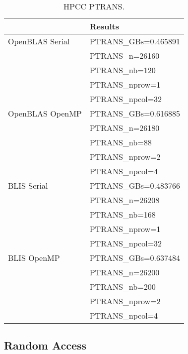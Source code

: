 \begin{table}[H]
\begin{center}
\begin{tabular}{ |l|l| } 
\hline
                & Results \\
\hline
OpenBLAS Serial & PTRANS\_GBs=0.465891 \\
                & PTRANS\_n=26160 \\ 
                & PTRANS\_nb=120 \\
                & PTRANS\_nprow=1 \\
                & PTRANS\_npcol=32 \\
\hline
OpenBLAS OpenMP & PTRANS\_GBs=0.616885 \\
                & PTRANS\_n=26180 \\
                & PTRANS\_nb=88 \\
                & PTRANS\_nprow=2 \\
                & PTRANS\_npcol=4 \\
\hline
BLIS Serial     & PTRANS\_GBs=0.483766 \\
                & PTRANS\_n=26208 \\
                & PTRANS\_nb=168 \\
                & PTRANS\_nprow=1 \\
                & PTRANS\_npcol=32 \\
\hline
BLIS OpenMP     & PTRANS\_GBs=0.637484 \\
                & PTRANS\_n=26200 \\
                & PTRANS\_nb=200 \\
                & PTRANS\_nprow=2 \\
                & PTRANS\_npcol=4 \\
\hline
\end{tabular}
\end{center}
\caption{\label{tab:table-name}HPCC PTRANS.}
\end{table}


%
%
\subsection{Random Access}

